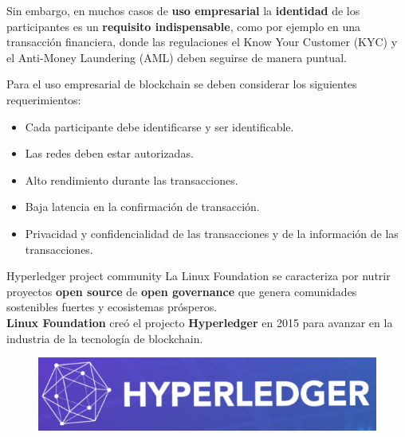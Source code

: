 \documentclass{beamer}
\begin{document}
	\begin{frame}
		Sin embargo, en muchos casos de \textbf{uso empresarial} la \textbf{identidad} de los participantes es un \textbf{requisito indispensable}, como por ejemplo en una transacción financiera, donde las regulaciones el Know Your Customer (KYC) y el Anti-Money Laundering (AML) deben seguirse de manera puntual.
	\end{frame}
	
	\begin{frame}
		Para el uso empresarial de blockchain se deben considerar los siguientes requerimientos:
		
		\begin{itemize}
			\item Cada participante debe identificarse y ser identificable.
			\item Las redes deben estar autorizadas.
			\item Alto rendimiento durante las transacciones.
			\item Baja latencia en la confirmación de transacción.
			\item Privacidad y confidencialidad de las transacciones y de la información de las transacciones.
		\end{itemize}
	\end{frame}

	\begin{frame}
		\begin{block}{Hyperledger project community}
			La Linux Foundation se caracteriza por nutrir proyectos \textbf{open source} de \textbf{open governance} que genera comunidades sostenibles fuertes y ecosistemas prósperos.\\
			\vspace{4mm}
			\textbf{Linux Foundation} creó el projecto \textbf{Hyperledger} en 2015 para avanzar en la industria de la tecnología de blockchain.
			\begin{figure}[h]
				\includegraphics[scale=.3]{hyperledger_logo}
				\centering
			\end{figure}
		\end{block}
	\end{frame}
\end{document}
